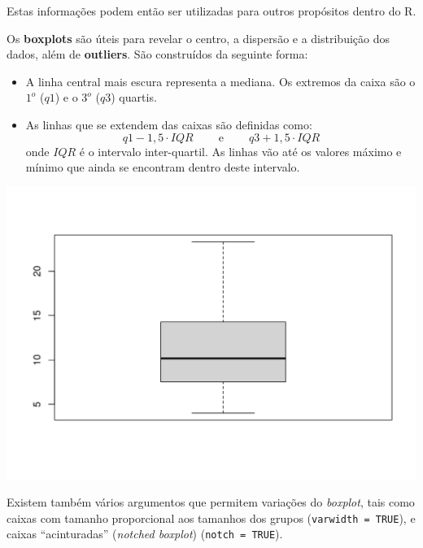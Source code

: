 \documentclass[
  10pt,
  a4paper]{book}
\newenvironment{Shaded}{\begin{snugshade}}{\end{snugshade}}
\newcommand{\FunctionTok}[1]{\textcolor[rgb]{0.00,0.00,0.00}{#1}}
\newcommand{\NormalTok}[1]{#1}
\newcommand{\SpecialCharTok}[1]{\textcolor[rgb]{0.00,0.00,0.00}{#1}}
\providecommand{\tightlist}{%
  \setlength{\itemsep}{0pt}\setlength{\parskip}{0pt}}
\begin{document}
Estas informações podem então ser utilizadas para outros propósitos
dentro do R.

Os \textbf{boxplots} são úteis para revelar o centro, a dispersão e a
distribuição dos dados, além de \textbf{outliers}. São construídos da
seguinte forma:

\begin{itemize}
\tightlist
\item
  A linha central mais escura representa a mediana. Os extremos da
  caixa são o \(1^{o}\) (\(q1\)) e o \(3^{o}\) (\(q3\)) quartis.
\item
  As linhas que se extendem das caixas são definidas como:
  \[q1-1,5\cdot IQR\ \qquad \mathrm{e}\ \qquad q3+1,5\cdot IQR\]
  onde \(IQR\) é o intervalo inter-quartil. As linhas vão até os valores
  máximo e mínimo que ainda se encontram dentro deste intervalo.
\end{itemize}

\begin{Shaded}
\end{Shaded}

\begin{center}\includegraphics{figures/unnamed-chunk-312-1} \end{center}

Existem também vários argumentos que permitem variações do \emph{boxplot},
tais como caixas com tamanho proporcional aos tamanhos
dos grupos (\texttt{varwidth\ =\ TRUE}), e caixas ``acinturadas'' (\emph{notched
boxplot}) (\texttt{notch\ =\ TRUE}).
\end{document}
